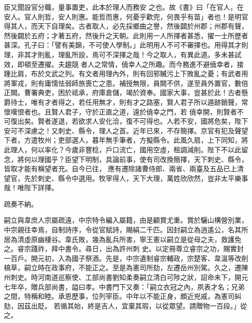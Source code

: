 \begin{pinyinscope}
 臣又聞設官分職，量事置吏，此本於理人而務安
 之也。故《書》曰「在官人，在安人。官人則哲，安人則惠。能哲而惠，何憂乎歡兜，何畏乎有苗」者也！是明官得其人，而天下自理矣。古者取人，必先採鄉曲之譽，然後闢於州郡；州郡有聲，然後闢於五府；才著五府，然後升之天朝。此則用一人所擇者甚悉，擢一士所歷者甚深。孔子曰：「譬有美錦，不可使人學制。」此明用人不可不審擇也。用得其才則理，非其才則亂，理亂所設，焉可不深擇之哉！今之取人，有異此道。多未甚試效，即頓至遷擢。夫趨競
 者人之常情，僥幸人之所趣。而今務進不避僥幸者，接踵比肩，布於文武之列。有文者用理內外，則有回邪贓污上下敗亂之憂；有武者用將軍戎，則有庸懦怯弱師旅喪亡之患。補授無限，員闕不供，遂至員外置官，數倍正闕。曹署典吏，困於祗承，府庫倉儲，竭於資奉。國家大事，豈甚於此！古者懸爵待士，唯有才者得之，若任用無才，則有才之路塞，賢人君子所以遁跡銷聲，常懷嘆恨者也。且賢人君子，守於正直之道，遠於僥幸之門，若
 僥幸開，則賢者不可復出矣。賢者遂退，若欲求人安化洽，復不可得也。人若不安，國將危矣，陛下安可不深慮之！又刺史、縣令，理人之首。近年已來，不存簡擇。京官有犯及聲望下者，方遣牧州；吏部選人，暮年無手筆者，方擬縣令。此風久扇，上下同知，將此理人，何以率化？今歲非豐稔，戶口流亡，國用空虛，租調減削。陛下不以此留念，將何以理國乎？臣望下明制，具論前事，使有司改換簡擇，天下刺史、縣令，皆取才能有稱望者充。自今已往，
 應有遷除諸曹侍郎、兩省、兩臺及五品已上清望官，先於刺史、縣令中選用。牧宰得人，天下大理，萬姓欣欣然，豈非太平樂事哉！唯陛下詳擇。



 疏奏不納。



 嗣立與韋庶人宗屬疏遠，中宗特令編入屬籍，由是顧賞尤重。賞於驪山構營別業，中宗親往幸焉，自制詩序，令從官賦詩，賜絹二千匹。因封嗣立為逍遙公，名其所居為清虛原幽棲谷。韋氏敗，幾為亂兵所害，寧王憲以嗣立是從母之夫，救護免之。睿宗踐祚，拜中書令。尋日，出為許州刺
 史。以定冊尊立睿宗之功，賜實封一百戶。開元初，入為國子祭酒。先是，中宗遺制睿宗輔政，宗楚客、韋溫等改削槁草，嗣立時在政事府，不能正之。至是為憲司所劾，左遷岳州別駕。久之，遷陳州刺史。時河南道巡察使、工部尚書劉知柔奏嗣立清白可陟之狀，詔命未下，開元七年卒，贈兵部尚書，謚曰孝。中書門下又奏：「嗣立衣冠之內，夙表才名；兄弟之間，特稱和睦。承恩歷事，位列宰臣。中年以不能正身，頗近兇戚，為憲司糾劾，因茲出貶。
 若循其始，終是吉人，宜棄其瑕，以從眾望。請贈物一百段。」從之。




\end{pinyinscope}
